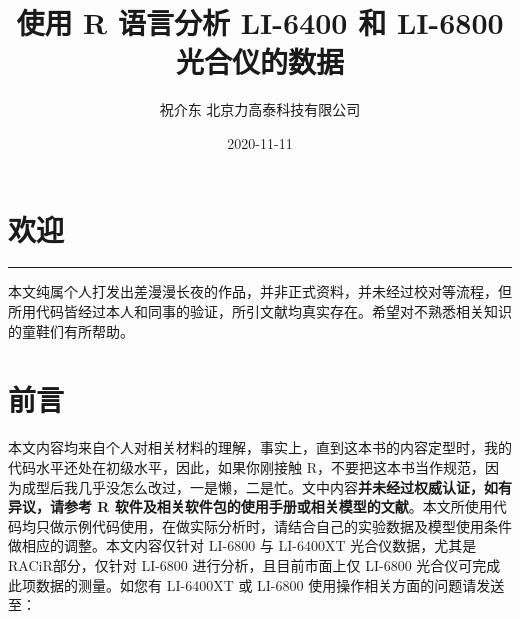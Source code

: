 \documentclass[
]{krantz}
\title{使用 R 语言分析 LI-6400 和 LI-6800 光合仪的数据}
\author{祝介东 北京力高泰科技有限公司}
\date{2020-11-11}
\begin{document}
\maketitle





\thispagestyle{empty}

\setlength{\abovedisplayskip}{-5pt}
\setlength{\abovedisplayshortskip}{-5pt}

{
\hypersetup{linkcolor=}
\setcounter{tocdepth}{2}
\tableofcontents
}
\listoftables
\listoffigures
\hypertarget{welcome}{%
\chapter*{欢迎}\label{welcome}}


\begin{center}\rule{0.5\linewidth}{0.5pt}\end{center}

本文纯属个人打发出差漫漫长夜的作品，并非正式资料，并未经过校对等流程，但所用代码皆经过本人和同事的验证，所引文献均真实存在。希望对不熟悉相关知识的童鞋们有所帮助。

\frontmatter

\hypertarget{frontmatter}{%
\chapter*{前言}\label{frontmatter}}


本文内容均来自个人对相关材料的理解，事实上，直到这本书的内容定型时，我的代码水平还处在初级水平，因此，如果你刚接触 R，不要把这本书当作规范，因为成型后我几乎没怎么改过，一是懒，二是忙。文中内容\textbf{并未经过权威认证，如有异议，请参考 R 软件及相关软件包的使用手册或相关模型的文献}。本文所使用代码均只做示例代码使用，在做实际分析时，请结合自己的实验数据及模型使用条件做相应的调整。本文内容仅针对
LI-6800 与 LI-6400XT 光合仪数据，尤其是 RACiR\texttrademark 部分，仅针对 LI-6800
进行分析，且目前市面上仅 LI-6800 光合仪可完成此项数据的测量。如您有 LI-6400XT 或 LI-6800 使用操作相关方面的问题请发送至：
\end{document}

